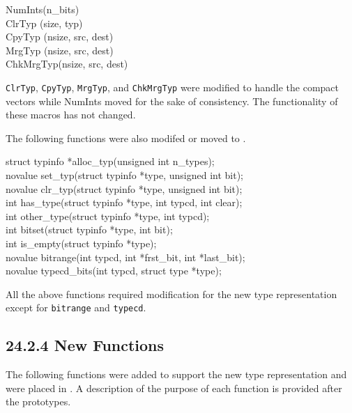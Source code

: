 \goodbreak
\begin{iconcode}
NumInts(n\_bits)\\
ClrTyp (size, typ)\\
CpyTyp (nsize, src, dest)\\
MrgTyp (nsize, src, dest)\\
ChkMrgTyp(nsize, src, dest)\\
\end{iconcode}

\texttt{ClrTyp}, \texttt{CpyTyp}, \texttt{MrgTyp}, and
\texttt{ChkMrgTyp} were modified to handle the compact vectors while
NumInts moved for the sake of consistency. The functionality of these
macros has not changed.

The following functions were also modifed or moved to .

\goodbreak
\begin{iconcode}
struct typinfo *alloc\_typ(unsigned int n\_types);\\
novalue set\_typ(struct typinfo *type, unsigned int bit);\\
novalue clr\_typ(struct typinfo *type, unsigned int bit);\\
int has\_type(struct typinfo *type, int typcd, int clear);\\
int other\_type(struct typinfo *type, int typcd);\\
int bitset(struct typinfo *type, int bit);\\
int is\_empty(struct typinfo *type);\\
novalue bitrange(int typcd, int *frst\_bit, int *last\_bit);\\
novalue typecd\_bits(int typcd, struct type *type);\\
\end{iconcode}


All the above functions required modification for the new type
representation except for \texttt{bitrange} and \texttt{typecd}.

\subsection[24.2.4 New Functions]{24.2.4 New Functions}

The following functions were added to support the new type
representation and were placed in . A description of
the purpose of each function is provided after the prototypes.



